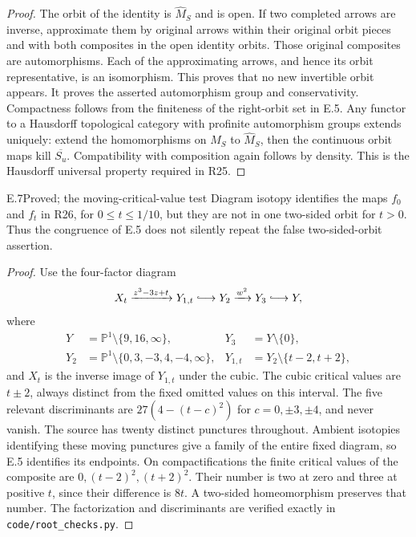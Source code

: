 \begin{proof}
The orbit of the identity is $\widehat M_S$ and is open.
If two completed arrows are inverse, approximate them by original
arrows within their original orbit pieces and with both composites
in the open identity orbits. Those original composites are
automorphisms. Each of the approximating arrows, and hence its
orbit representative, is an isomorphism. This proves that no
new invertible orbit appears. It proves the asserted automorphism
group and conservativity. Compactness follows from the finiteness
of the right-orbit set in E.5. Any functor to a Hausdorff
topological category with profinite automorphism groups extends
uniquely: extend the homomorphisms on $M_S$ to $\widehat M_S$,
then the continuous orbit maps kill $\overline{S_u}$.
Compatibility with composition again follows by density. This is
the Hausdorff universal property required in R25.
\end{proof}

\begin{claim}{E.7}{Proved; the moving-critical-value test}
Diagram isotopy identifies the maps $f_0$ and $f_t$ in R26,
for $0\leq t\leq1/10$, but they are not in one two-sided
orbit for $t>0$. Thus the congruence of E.5 does not silently
repeat the false two-sided-orbit assertion.
\end{claim}
\begin{proof}
Use the four-factor diagram
\[
X_t\xrightarrow{z^3-3z+t}Y_{1,t}
 \lhook\joinrel\longrightarrow Y_2
 \xrightarrow{w^2}Y_3\lhook\joinrel\longrightarrow Y,
\]
where
\begin{align*}
Y&=\mathbb P^1\setminus\{9,16,\infty\},
&Y_3&=Y\setminus\{0\},\\
Y_2&=\mathbb P^1\setminus\{0,3,-3,4,-4,\infty\},
&Y_{1,t}&=Y_2\setminus\{t-2,t+2\},
\end{align*}
and $X_t$ is the inverse image of $Y_{1,t}$ under the cubic.
The cubic critical values are $t\pm2$, always distinct from
the fixed omitted values on this interval. The five relevant
discriminants are $27(4-(t-c)^2)$ for
$c=0,\pm3,\pm4$, and never vanish. The source has twenty
distinct punctures throughout. Ambient isotopies identifying
these moving punctures give a family of the entire fixed diagram,
so E.5 identifies its endpoints. On compactifications the finite
critical values of the composite are
$0,(t-2)^2,(t+2)^2$. Their number is two at zero and three at
positive $t$, since their difference is $8t$. A two-sided
homeomorphism preserves that number. The factorization and
discriminants are verified exactly in \texttt{code/root\_checks.py}.
\end{proof}

